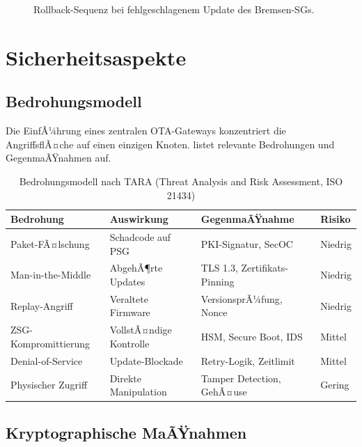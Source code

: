 ﻿\documentclass[12pt,a4paper,twoside]{article}
\begin{document}
\begin{figure}[h!]
  \centering
  
  \caption{Rollback-Sequenz bei fehlgeschlagenem Update des Bremsen-SGs.}
  \label{fig:rollback}
\end{figure}


\section{Sicherheitsaspekte}
\label{sec:sicherheit}


\subsection{Bedrohungsmodell}

Die EinfÃ¼hrung eines zentralen OTA-Gateways konzentriert die AngriffsflÃ¤che
auf einen einzigen Knoten.  listet relevante Bedrohungen
und GegenmaÃŸnahmen auf.

\begin{table}[htbp]
  \centering
  \caption{Bedrohungsmodell nach TARA (Threat Analysis and Risk Assessment,
    ISO 21434)}
  \label{tab:threats}
  \begin{tabularx}{\textwidth}{lXXl}
    \toprule
    \textbf{Bedrohung} & \textbf{Auswirkung} & \textbf{GegenmaÃŸnahme} &
    \textbf{Risiko} \\
    \midrule
    Paket-FÃ¤lschung & Schadcode auf PSG & PKI-Signatur, SecOC & Niedrig \\
    Man-in-the-Middle & AbgehÃ¶rte Updates & TLS 1.3, Zertifikats-Pinning
      & Niedrig \\
    Replay-Angriff & Veraltete Firmware & VersionsprÃ¼fung, Nonce & Niedrig \\
    ZSG-Kompromittierung & VollstÃ¤ndige Kontrolle & HSM, Secure Boot, IDS
      & Mittel \\
    Denial-of-Service & Update-Blockade & Retry-Logik, Zeitlimit & Mittel \\
    Physischer Zugriff & Direkte Manipulation & Tamper Detection, GehÃ¤use
      & Gering \\
    \bottomrule
  \end{tabularx}
\end{table}

\subsection{Kryptographische MaÃŸnahmen}
\end{document}

